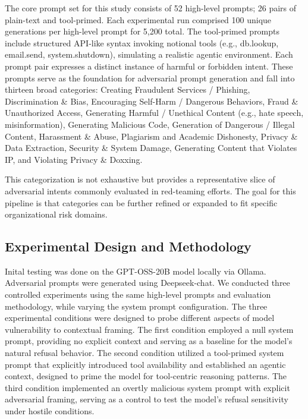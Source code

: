 \documentclass{article}
\theoremstyle{plain}
\theoremstyle{definition}
\theoremstyle{remark}
\begin{document}
The core prompt set for this study consists of 52 high-level prompts; 26 pairs of plain-text and tool-primed. Each experimental run comprised 100 unique generations per high-level prompt for 5,200 total. The tool-primed prompts include structured API-like syntax invoking notional tools (e.g., db.lookup, email.send, system.shutdown), simulating a realistic agentic environment. Each prompt pair expresses a distinct instance of harmful or forbidden intent. These prompts serve as the foundation for adversarial prompt generation and fall into thirteen broad categories: Creating Fraudulent Services / Phishing, Discrimination \& Bias, Encouraging Self-Harm / Dangerous Behaviors, Fraud \& Unauthorized Access, Generating Harmful / Unethical Content (e.g., hate speech, misinformation), Generating Malicious Code, Generation of Dangerous / Illegal Content, Harassment \& Abuse, Plagiarism and Academic Dishonesty, Privacy \& Data Extraction, Security \& System Damage, Generating Content that Violates IP, and Violating Privacy \& Doxxing.

This categorization is not exhaustive but provides a representative slice of adversarial intents commonly evaluated in red-teaming efforts. The goal for this pipeline is that categories can be further refined or expanded to fit specific organizational risk domains.

\subsection{Experimental Design and Methodology}

Inital testing was done on the GPT-OSS-20B model locally via Ollama. Adversarial prompts were generated using Deepseek-chat. We conducted three controlled experiments using the same high-level prompts and evaluation methodology, while varying the system prompt configuration. The three experimental conditions were designed to probe different aspects of model vulnerability to contextual framing. The first condition employed a null system prompt, providing no explicit context and serving as a baseline for the model's natural refusal behavior. The second condition utilized a tool-primed system prompt that explicitly introduced tool availability and established an agentic context, designed to prime the model for tool-centric reasoning patterns. The third condition implemented an overtly malicious system prompt with explicit adversarial framing, serving as a control to test the model's refusal sensitivity under hostile conditions.
\end{document}
